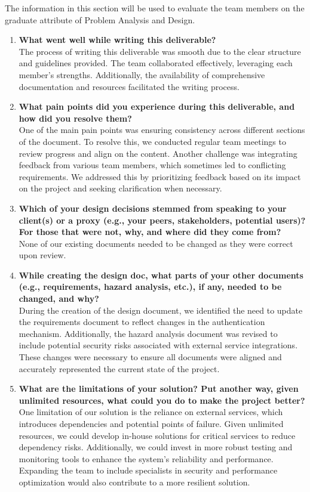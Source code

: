 \documentclass[12pt, titlepage]{article}
\begin{document}
The information in this section will be used to evaluate the team members on the
graduate attribute of Problem Analysis and Design.



\begin{enumerate}
  \item \textbf{What went well while writing this deliverable?}   \\
  The process of writing this deliverable was smooth due to the clear structure and guidelines provided. The team collaborated effectively, leveraging each member's strengths. Additionally, the availability of comprehensive documentation and resources facilitated the writing process.

  \item \textbf{What pain points did you experience during this deliverable, and how did you resolve them?}  \\
  One of the main pain points was ensuring consistency across different sections of the document. To resolve this, we conducted regular team meetings to review progress and align on the content. Another challenge was integrating feedback from various team members, which sometimes led to conflicting requirements. We addressed this by prioritizing feedback based on its impact on the project and seeking clarification when necessary.

  \item \textbf{Which of your design decisions stemmed from speaking to your client(s) or a proxy (e.g., your peers, stakeholders, potential users)? For those that were not, why, and where did they come from?}  \\
  None of our existing documents needed to be changed as they were correct upon review.

  \item \textbf{While creating the design doc, what parts of your other documents (e.g., requirements, hazard analysis, etc.), if any, needed to be changed, and why?}  \\
  During the creation of the design document, we identified the need to update the requirements document to reflect changes in the authentication mechanism. Additionally, the hazard analysis document was revised to include potential security risks associated with external service integrations. These changes were necessary to ensure all documents were aligned and accurately represented the current state of the project.

  \item \textbf{What are the limitations of your solution? Put another way, given unlimited resources, what could you do to make the project better?}  \\
  One limitation of our solution is the reliance on external services, which introduces dependencies and potential points of failure. Given unlimited resources, we could develop in-house solutions for critical services to reduce dependency risks. Additionally, we could invest in more robust testing and monitoring tools to enhance the system's reliability and performance. Expanding the team to include specialists in security and performance optimization would also contribute to a more resilient solution.


\end{enumerate}
\end{document}
